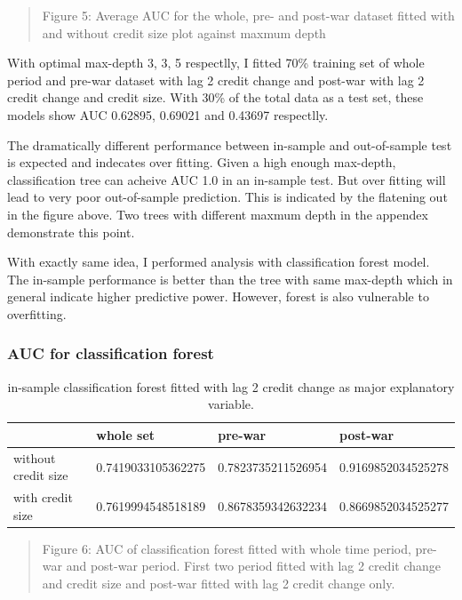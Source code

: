 \documentclass{article}
\newcommand{\ciapdf}[1]{\vspace*{-\parskip}\begin{center}\resizebox{0.75\textwidth}{!}{\texttt{[image: \#1]}}\end{center}}
\begin{document}
\ciapdf{Figure_6.pdf}
\begin{quote}
Figure 5: Average AUC for the whole, pre- and post-war dataset fitted
with and without credit size plot against maxmum depth
\end{quote}

With optimal max-depth 3, 3, 5 respectlly, I fitted 70\% training set of whole period and
pre-war dataset with lag 2 credit change and post-war with lag 2 credit
change and credit size. With 30\% of the total data as a test set, these models show AUC 0.62895,
0.69021 and 0.43697 respectlly.

The dramatically different performance between in-sample and
out-of-sample test is expected and indecates over fitting. Given a high enough
max-depth, classification tree can acheive AUC 1.0 in an in-sample test.
But over fitting will lead to very poor out-of-sample prediction. This
is indicated by the flatening out in the figure above. Two trees with different maxmum depth in the appendex demonstrate
this point.

With exactly same idea, I performed analysis with classification forest
model. The in-sample performance is better than the tree with same
max-depth which in general indicate higher predictive power. However, forest is also
vulnerable to overfitting.

\subsubsection*{\centering{}AUC for classification forest}


\begin{table}[H]
    \caption{in-sample classification forest fitted with lag 2 credit change
    as major explanatory variable.}
    \begin{center}\begin{tabular}{|l|l|l|l|}
    \hline
                        & whole set          & pre-war            & post-war           \\ \hline
    without credit size & 0.7419033105362275 & 0.7823735211526954 & 0.9169852034525278 \\ \hline
    with credit size    & 0.7619994548518189 & 0.8678359342632234 & 0.8669852034525277 \\ \hline
    \end{tabular}\end{center}
\end{table}

\ciapdf{Figure_7.pdf}
\begin{quote}
Figure 6: AUC of classification forest fitted with whole time period,
pre-war and post-war period. First two period fitted with lag 2 credit
change and credit size and post-war fitted with lag 2 credit change
only.
\end{quote}
\end{document}

